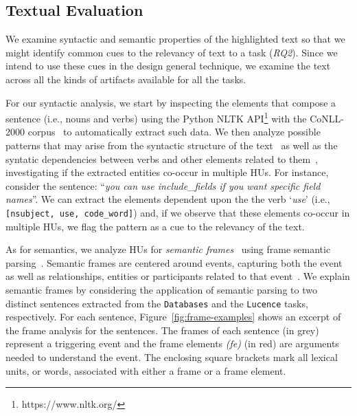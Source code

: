 
\subsection{Textual Evaluation}


We examine syntactic and semantic properties 
of the highlighted text so that 
we might identify
common cues to the relevancy of text to a task (\textit{RQ2}).
Since we intend to use these cues 
in the design general technique, 
we examine the text across 
all the kinds of artifacts 
available for all the tasks. 




For our syntactic analysis,
we start by inspecting the elements that compose a sentence (i.e., nouns and verbs)
using the Python NLTK API\footnote{https://www.nltk.org/} with the CoNLL-2000 corpus~\cite{Conll2000} to automatically extract such data.
We then analyze possible patterns that may arise from the syntactic structure of the text~\cite{Robillard2015}
as well as the syntatic dependencies between verbs and  other elements related to them~\cite{Chaparro2017}, investigating if the extracted entities co-occur in multiple HUs. 
For instance, consider the sentence:
``\textit{you can use include\_fields if you want specific field names}''.
We can extract the elements dependent upon the the verb `\textit{use}' (i.e., {\small \texttt{[nsubject, use, code\_word]}})
and, if we observe that these elements co-occur in multiple HUs, we flag the pattern as a cue to the relevancy of the text.





As for semantics, we
analyze HUs for \textit{semantic
frames}~\cite{fillmore1976frame}
using frame semantic parsing~\cite{Baker1998, jurafsky2014speech}.
Semantic frames are centered around events, capturing both the event
as well as relationships, entities or participants related to that
event~\cite{fillmore1976frame, Baker1998frame}. 
We explain semantic frames by considering the application
of semantic parsing to two distinct sentences extracted 
from the \texttt{Databases} and the \texttt{Lucence} tasks, respectively.
For each sentence, Figure~\ref{fig:frame-examples} shows an
excerpt of the frame analysis for the sentences. 
The frames of each sentence (in grey) represent a triggering event and the frame elements \textit{(fe)} (in red) are arguments needed to understand the event. The enclosing square brackets mark all lexical units, or words, associated with either a frame or a frame element.

